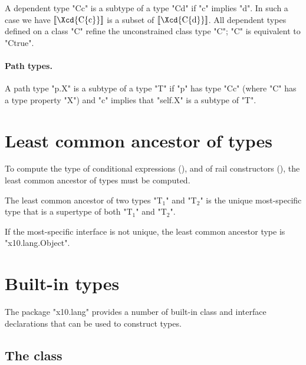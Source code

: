 A dependent type \xcd"C{c}" is a subtype of a type \xcd"C{d}" if
\xcd"c" implies \xcd"d".  In such a case we have
$\LL{\mbox{\Xcd{C\{c\}}}}$ is a
subset of $\LL{\mbox{\Xcd{C\{d\}}}}$. All dependent types
defined on a class \xcd"C"
refine the unconstrained class type \xcd"C"; \xcd"C" is
equivalent to \xcd"C{true}".

\paragraph{Path types.}

A path type \xcd"p.X" is a subtype of a type \xcd"T" if
\xcd"p" has type \xcd"C{c}" (where \xcd"C" has a type property
\xcd"X") and \xcd"c" implies that \xcd"self.X" is a subtype of \xcd"T".


\section{Least common ancestor of types}
\label{LCA}

To compute the type of conditional expressions
(),
and of rail constructors
(), the least common ancestor of types
must be computed.

The least common ancestor of two  types
\xcd"T$_1$" and \xcd"T$_2$"
is the
unique most-specific type
that is a supertype of both
\xcd"T$_1$" and \xcd"T$_2$".

If the most-specific interface is not unique, the
least common ancestor type is \xcd"x10.lang.Object".





\section{Built-in types}

The package \xcd"x10.lang" provides a number of built-in class and
interface declarations that can be used to construct types.

\subsection{The class }
\label{Object}

